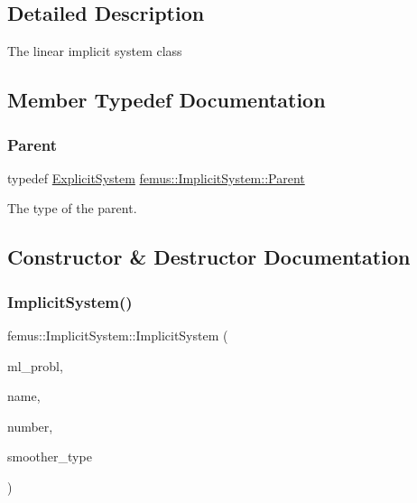 \subsection{Detailed Description}
The linear implicit system class 

\subsection{Member Typedef Documentation}
\mbox{\label{classfemus_1_1_implicit_system_a39f96fc06470f93e2f1ec047e5aafd4a}} 
\subsubsection{\texorpdfstring{Parent}{Parent}}
{\footnotesize\ttfamily typedef \mbox{\hyperlink{classfemus_1_1_explicit_system}{Explicit\+System}} \mbox{\hyperlink{classfemus_1_1_implicit_system_a39f96fc06470f93e2f1ec047e5aafd4a}{femus\+::\+Implicit\+System\+::\+Parent}}}

The type of the parent. 

\subsection{Constructor \& Destructor Documentation}
\mbox{\label{classfemus_1_1_implicit_system_a68d8a8ebd9a07e0b4115b39ecb03e06a}} 
\subsubsection{\texorpdfstring{Implicit\+System()}{ImplicitSystem()}}
{\footnotesize\ttfamily femus\+::\+Implicit\+System\+::\+Implicit\+System (\begin{DoxyParamCaption}\item[{\mbox{\hyperlink{classfemus_1_1_multi_level_problem}{Multi\+Level\+Problem}} \&}]{ml\+\_\+probl,  }\item[{const std\+::string \&}]{name,  }\item[{const unsigned int}]{number,  }\item[{const \mbox{\hyperlink{_mg_smoother_enum_8hpp_a4d11c2ff93e2f0f440c879a9c40cda71}{Mg\+Smoother}} \&}]{smoother\+\_\+type }\end{DoxyParamCaption})}

